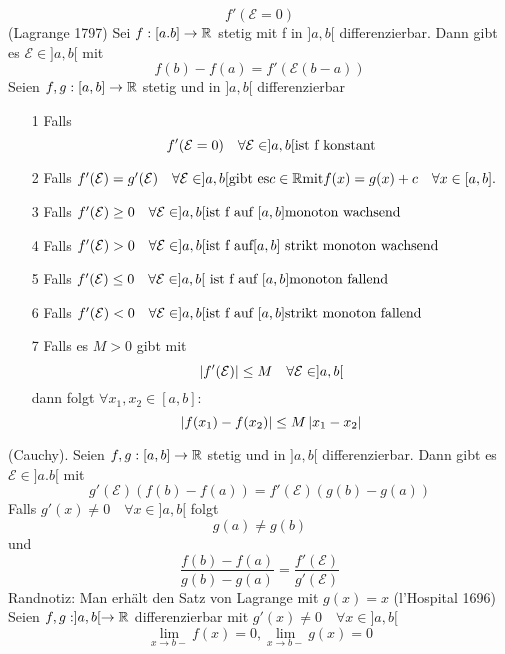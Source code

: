 \[f'(\mathcal{E} = 0)\]
 (Lagrange 1797) Sei \(f : [a.b] \rightarrow \mathbb{R} \) stetig mit f in \(]a,b[\) differenzierbar. Dann gibt es \( \mathcal{E} \in ]a,b[ \) mit 
\[f(b) - f(a) = f'(\mathcal{E} (b-a))\]
 Seien \(f,g : [a,b] \rightarrow \mathbb{R}\) stetig und in \(]a,b[\) differenzierbar
\begin{enumerate}
    \item [1] Falls \[f'(\mathcal{E} = 0) \quad \forall \mathcal{E} \in ]a,b[ \\ \text{ist f konstant}\]
    \item [2] Falls \(f'(\mathcal{E}) = g'(\mathcal{E}) \quad \forall \mathcal{E} \in ]a,b[ \\ \text{gibt es} c \in \mathbb{R} \text{mit} f(x) = g(x) + c \quad \forall x \in [a,b].\)
    \item [3] Falls \(f'(\mathcal{E}) \geq 0 \quad \forall \mathcal{E} \in ]a,b[ \\ \text{ist f auf } [a,b] \text{monoton wachsend}\)
    \item [4] Falls \(f'(\mathcal{E}) > 0 \quad \forall \mathcal{E} \in ]a,b[ \\ \text{ist f auf} [a,b] \text{ strikt monoton wachsend}\)
    \item [5] Falls \(f'(\mathcal{E}) \leq 0 \quad \forall \mathcal{E} \in ]a,b[ \\\text{ ist f auf } [a,b] \text{monoton fallend}\)
    \item [6] Falls \(f'(\mathcal{E}) < 0 \quad \forall \mathcal{E} \in ]a,b[ \\ \text{ist f auf } [a,b] \text{strikt monoton fallend}\)
    \item [7] Falls es \(M > 0 \) gibt mit
    \[\left\lvert f'(\mathcal{E}) \right\rvert \leq M \quad \forall \mathcal{E} \in ]a,b[\]
    dann folgt \( \forall x_1, x_2 \in [a,b] : \)
    \[\left\lvert f(x_1) - f(x_2) \right\rvert \leq M \left\lvert x_1 - x_2 \right\rvert\]
\end{enumerate}
 (Cauchy). Seien \(f,g : [a,b] \rightarrow \mathbb{R} \) stetig und in \(]a,b[\) differenzierbar. Dann gibt es \( \mathcal{E} \in ]a.b[ \) mit 
\[ g'(\mathcal{E}) (f(b) - f(a)) = f'(\mathcal{E}) (g(b) - g(a))\]
Falls \(g'(x) \neq 0 \quad \forall x \in ]a,b[ \) folgt
\[g(a) \neq g(b)\]
und
\[\frac{f(b) - f(a)}{g(b) - g(a) } = \frac{f'(\mathcal{E})}{g'(\mathcal{E})}\]
Randnotiz: Man erhält den Satz von Lagrange mit \(g(x) = x\)
 (l'Hospital 1696) Seien \(f,g : ]a,b[ \rightarrow \mathbb{R} \) differenzierbar mit \(g'(x) \neq 0 \quad \forall x \in ]a,b[\)
\[ \lim\limits_{x \rightarrow b-}f(x) = 0, \lim\limits_{x \rightarrow b-} g(x) = 0\]
